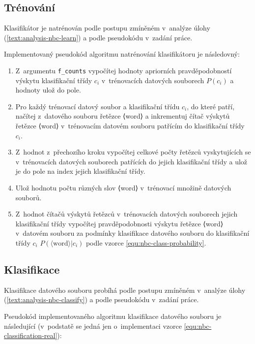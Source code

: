 \documentclass[a4paper, 12pt]{report}
\begin{document}
\subsection{Trénování}

Klasifikátor je natrénován podle postupu zmíněném v~analýze úlohy 
(\ref{text:analysis-nbc-learn}) a podle pseudokódu v~zadání práce.

Implementovaný pseudokód algoritmu natrénování klasifikátoru je 
následovný:

\begin{enumerate}
    \item Z~argumentu \texttt{f\_counts} vypočítej hodnoty apriorních 
pravděpodobností výskytu klasifikační třídy $c_i$ v~trénovacích datových 
souborech $P(c_i)$ a hodnoty ulož do pole.

    \item Pro každý trénovací datový soubor a klasifikační třídu $c_i$, do 
které patří, načítej z~datového souboru řetězce ⟨word⟩ a inkrementuj čítač 
výskytů řetězce ⟨word⟩ v~trénovacím datovém souboru patřícím do 
klasifikační třídy $c_i$.

    \item Z~hodnot z~přechozího kroku vypočítej celkové počty řetězců 
vyskytujících se v~trénovacích datových souborech patřících do jejich 
klasifikační třídy a ulož je do pole na index jejich klasifikační třídy.

    \item Ulož hodnotu počtu různých slov ⟨word⟩ v~trénovací množině 
datových souborů.

    \item Z~hodnot čítačů výskytů řetězců v~trénovacích datových souborech 
jejich klasifikační třídy vypočítej pravděpodobnosti výskytu řetězce  
⟨word⟩ v~datovém souboru za podmínky klasifikace datového souboru do 
klasifikační třídy $c_i$ $P(\langle \text{word} \rangle|c_i)$ podle vzorce 
\ref{equ:nbc-class-probability}.
\end{enumerate}

\subsection{Klasifikace}

Klasifikace datového souboru probíhá podle postupu zmíněném v~analýze 
úlohy (\ref{text:analysis-nbc-classify}) a podle pseudokódu v~zadání 
práce.

Pseudokód implementovaného algoritmu klasifikace datového souboru je 
následující (v~podstatě se jedná jen o~implementaci vzorce 
\ref{equ:nbc-classification-real}):
\end{document}
